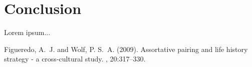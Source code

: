 \documentclass[12pt, spanish]{article}
\begin{document}







\section{Conclusion} %

Lorem ipsum...


\begin{thebibliography}{99} %

Figueredo, A.~J. and Wolf, P. S.~A. (2009).
\newblock Assortative pairing and life history strategy - a cross-cultural
  study.
, 20:317--330.
 
\end{thebibliography}

\end{document}
